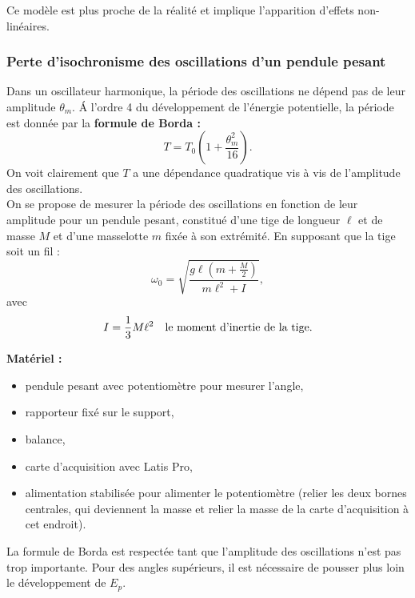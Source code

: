 \documentclass[11pt,a4paper]{report}
\begin{document}
Ce modèle est plus proche de la réalité et implique l'apparition d'effets non-linéaires.

\subsubsection*{Perte d'isochronisme des oscillations d'un pendule pesant}

Dans un oscillateur harmonique, la période des oscillations ne dépend pas de leur amplitude $\theta_m$. \'A l'ordre 4 du développement de l'énergie potentielle, la période est donnée par la \textbf{formule de Borda :}
\begin{equation}
	\boxed{T = T_0\left(1 + \frac{\theta_m^2}{16}\right)}.
\end{equation}
On voit clairement que $T$ a une dépendance quadratique vis à vis de l'amplitude des oscillations.\\

On se propose de mesurer la période des oscillations en fonction de leur amplitude pour un pendule pesant, constitué d'une tige de longueur $\ell$ et de masse $M$ et d'une masselotte $m$ fixée à son extrémité. En supposant que la tige soit un fil :
\begin{equation}
	\omega_0 = \sqrt{\frac{g\ell\left(m + \frac{M}{2}\right)}{m\ell^2 + I}},
\end{equation}
avec
\begin{equation}
	I = \frac{1}{3}M\ell^2 \quad\text{le moment d'inertie de la tige.}\\
\end{equation}

\textbf{Matériel :}
\begin{itemize}
	\item pendule pesant avec potentiomètre pour mesurer l'angle,
	\item rapporteur fixé sur le support,
	\item balance,
	\item carte d'acquisition avec Latis Pro,
	\item alimentation stabilisée pour alimenter le potentiomètre (relier les deux bornes 			centrales, qui deviennent la masse et relier la masse de la carte d'acquisition à cet 			endroit).\\
\end{itemize}

La formule de Borda est respectée tant que l'amplitude des oscillations n'est pas trop importante. Pour des angles supérieurs, il est nécessaire de pousser plus loin le développement de $E_p$.\\
\end{document}
